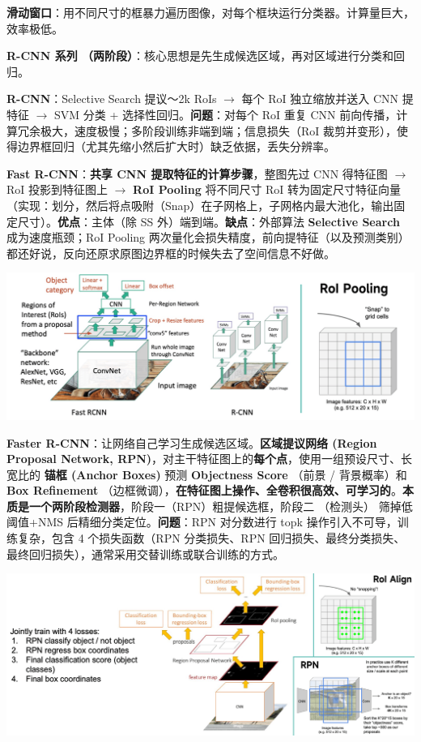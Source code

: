 \documentclass[
  8pt]{extarticle}
\begin{document}
\begin{multicols*}{4}
\textbf{滑动窗口}：用不同尺寸的框暴力遍历图像，对每个框块运行分类器。计算量巨大，效率极低。

\textbf{R-CNN 系列
（两阶段）}：核心思想是先生成候选区域，再对区域进行分类和回归。

\textbf{R-CNN}：Selective Search 提议～2k RoIs \(\rightarrow\) 每个 RoI
独立缩放并送入 CNN 提特征 \(\rightarrow\) SVM 分类 +
选择性回归。\textbf{问题}：对每个 RoI 重复 CNN
前向传播，计算冗余极大，速度极慢；多阶段训练非端到端；信息损失（RoI
裁剪并变形），使得边界框回归（尤其先缩小然后扩大时）缺乏依据，丢失分辨率。

\textbf{Fast R-CNN}：\textbf{共享 CNN 提取特征的计算步骤}，整图先过 CNN
得特征图 \(\rightarrow\) RoI 投影到特征图上 \(\rightarrow\) \textbf{RoI
Pooling} 将不同尺寸 RoI
转为固定尺寸特征向量（实现：划分，然后将点吸附（Snap）在子网格上，子网格内最大池化，输出固定尺寸）。\textbf{优点}：主体（除
SS 外）端到端。\textbf{缺点}：外部算法 \textbf{Selective Search}
成为速度瓶颈；RoI Pooling
两次量化会损失精度，前向提特征（以及预测类别）都还好说，反向还原求原图边界框的时候失去了空间信息不好做。

\includegraphics{./Cheatsheet-03-Detection-and-Segmentation.assets/image-20250618042307585.png}

\textbf{Faster R-CNN}：让网络自己学习生成候选区域。\textbf{区域提议网络
(Region Proposal Network,
RPN)}，对主干特征图上的\textbf{每个点}，使用一组预设尺寸、长宽比的
\textbf{锚框 (Anchor Boxes)} 预测 \textbf{Objectness Score} （前景 /
背景概率）和 \textbf{Box Refinement}
（边框微调），\textbf{在特征图上操作、全卷积很高效、可学习的}。\textbf{本质是一个两阶段检测器}，阶段一（RPN）粗提候选框，阶段二
（检测头） 筛掉低阈值+NMS 后精细分类定位。\textbf{问题}：RPN 对分数进行
topk 操作引入不可导，训练复杂，包含 4 个损失函数（RPN 分类损失、RPN
回归损失、最终分类损失、最终回归损失），通常采用交替训练或联合训练的方式。

\includegraphics{./Cheatsheet-03-Detection-and-Segmentation.assets/image-20250618042701373.png}


\end{multicols*}
\end{document}
